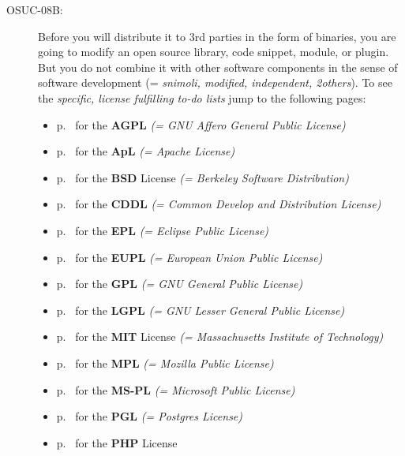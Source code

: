 \begin{description}
\item[OSUC-08B:]\label{OSUC-08B-DEF} Before you will distribute it to 3rd
parties in the form of binaries, you are going to modify an open source library,
code snippet, module, or plugin. But you do not combine it with other software
components in the sense of software development (= \textit{snimoli, modified,
independent, 2others}). To see the \textit{specific, license fulfilling to-do
lists} jump to the following pages:
  \begin{itemize}
    \item p.\ \pageref{OSUC-08B-AGPL} for the \textbf{AGPL}
      \textit{(= GNU Affero General Public License)} 
    \item p.\ \pageref{OSUC-08B-Apache20} for the \textbf{ApL}
      \textit{(= Apache License)}
    \item p.\ \pageref{OSUC-08B-BSD} for the \textbf{BSD} License
      \textit{(= Berkeley Software Distribution)}
    \item p.\ \pageref{OSUC-08B-CDDL} for the \textbf{CDDL}
      \textit{(= Common Develop and Distribution License)}  
    \item p.\ \pageref{OSUC-08B-EPL} for the \textbf{EPL}
      \textit{(= Eclipse Public License)}     
    \item p.\ \pageref{OSUC-08B-EUPL} for the \textbf{EUPL}
      \textit{(= European Union Public License)} 
    \item p.\ \pageref{OSUC-08B-GPL} for the \textbf{GPL}
       \textit{(= GNU General Public License)} 
    \item p.\ \pageref{OSUC-08B-LGPL} for the \textbf{LGPL}
      \textit{(= GNU Lesser General Public License)}           
    \item p.\ \pageref{OSUC-08B-MIT} for the \textbf{MIT} License
       \textit{(= Massachusetts Institute of Technology)} 
    \item p.\ \pageref{OSUC-08B-MPL} for the \textbf{MPL}
      \textit{(= Mozilla Public License)}     
    \item p.\ \pageref{OSUC-08B-MS-PL} for the \textbf{MS-PL}
      \textit{(= Microsoft Public License)} 
    \item p.\ \pageref{OSUC-08B-PGL} for the \textbf{PGL}
      \textit{(= Postgres License)} 
    \item p.\ \pageref{OSUC-08B-PHP} for the \textbf{PHP} License 
  \end{itemize}


\end{description}
